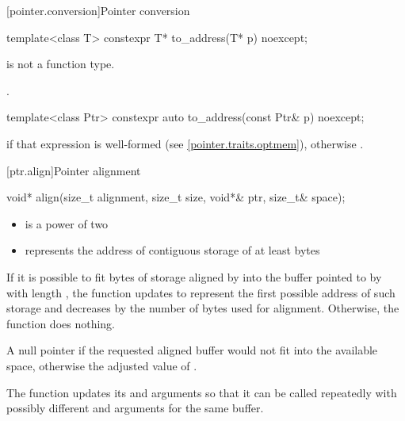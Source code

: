 [pointer.conversion]{Pointer conversion}

%
\begin{itemdecl}
template<class T> constexpr T* to_address(T* p) noexcept;
\end{itemdecl}

\begin{itemdescr}
\pnum
\mandates
{} is not a function type.

\pnum
\returns
{}.
\end{itemdescr}

%
\begin{itemdecl}
template<class Ptr> constexpr auto to_address(const Ptr& p) noexcept;
\end{itemdecl}

\begin{itemdescr}
\pnum
\returns
{} if that expression is well-formed
(see \ref{pointer.traits.optmem}),
otherwise .
\end{itemdescr}

[ptr.align]{Pointer alignment}

%
\begin{itemdecl}
void* align(size_t alignment, size_t size, void*& ptr, size_t& space);
\end{itemdecl}

\begin{itemdescr}
\pnum
\expects
\begin{itemize}
\item
{} is a power of two

\item
{} represents the address of contiguous storage of at least
 bytes
\end{itemize}

\pnum
\effects
If it is possible to fit  bytes
of storage aligned by  into the buffer pointed to by
 with length , the function updates
 to represent the first possible address of such storage
and decreases  by the number of bytes used for alignment.
Otherwise, the function does nothing.

\pnum
\returns
A null pointer if the requested aligned buffer
would not fit into the available space, otherwise the adjusted value
of .

\pnum
\begin{note}
The function updates its 
and  arguments so that it can be called repeatedly
with possibly different  and 
arguments for the same buffer.
\end{note}
\end{itemdescr}

